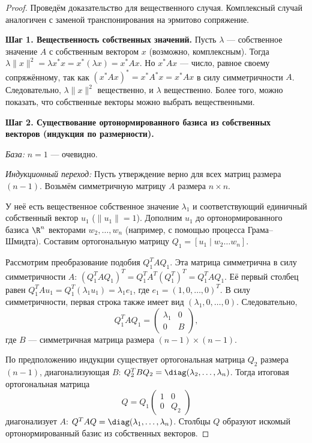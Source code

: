 \documentclass[10pt]{article}
\begin{document}
\begin{proof}
    Проведём доказательство для вещественного случая. Комплексный случай аналогичен с заменой транспонирования на эрмитово сопряжение.

    \textbf{Шаг 1. Вещественность собственных значений.}
    Пусть $\lambda$ — собственное значение $A$ с собственным вектором $x$ (возможно, комплексным). Тогда $\lambda \|x\|^2 = \lambda x^* x = x^* (\lambda x) = x^* A x$. Но $x^* A x$ — число, равное своему сопряжённому, так как $(x^* A x)^* = x^* A^* x = x^* A x$ в силу симметричности $A$. Следовательно, $\lambda \|x\|^2$ вещественно, и $\lambda$ вещественно. Более того, можно показать, что собственные векторы можно выбрать вещественными.

    \textbf{Шаг 2. Существование ортонормированного базиса из собственных векторов (индукция по размерности).}
    
    \textit{База:} $n=1$ — очевидно.
    
    \textit{Индукционный переход:} Пусть утверждение верно для всех матриц размера $(n-1)$. Возьмём симметричную матрицу $A$ размера $n\times n$.
    
    У неё есть вещественное собственное значение $\lambda_1$ и соответствующий единичный собственный вектор $u_1$ ($\|u_1\|=1$). Дополним $u_1$ до ортонормированного базиса $\R^n$ векторами $w_2,\dots,w_n$ (например, с помощью процесса Грама–Шмидта). Составим ортогональную матрицу $Q_1 = [u_1 \mid w_2 \dots w_n]$.
    
    Рассмотрим преобразование подобия $Q_1^T A Q_1$. Эта матрица симметрична в силу симметричности $A$: $(Q_1^T A Q_1)^T = Q_1^T A^T (Q_1^T)^T = Q_1^T A Q_1$. Её первый столбец равен $Q_1^T A u_1 = Q_1^T (\lambda_1 u_1) = \lambda_1 e_1$, где $e_1 = (1,0,\dots,0)^T$. В силу симметричности, первая строка также имеет вид $(\lambda_1, 0,\dots,0)$. Следовательно,
    \[
    Q_1^T A Q_1 = \begin{pmatrix}
    \lambda_1 & 0 \\
    0 & B
    \end{pmatrix},
    \]
    где $B$ — симметричная матрица размера $(n-1)\times (n-1)$.
    
    По предположению индукции существует ортогональная матрица $Q_2$ размера $(n-1)$, диагонализующая $B$: $Q_2^T B Q_2 = \diag(\lambda_2,\dots,\lambda_n)$. Тогда итоговая ортогональная матрица
    \[
    Q = Q_1 \begin{pmatrix} 1 & 0 \\ 0 & Q_2 \end{pmatrix}
    \]
    диагонализует $A$: $Q^T A Q = \diag(\lambda_1,\dots,\lambda_n)$. Столбцы $Q$ образуют искомый ортонормированный базис из собственных векторов.
\end{proof}
\end{document}
